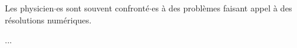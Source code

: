 Les physicien$\cdot$es sont souvent confronté$\cdot$es à des problèmes faisant appel à des résolutions numériques. 

...

\medskip

